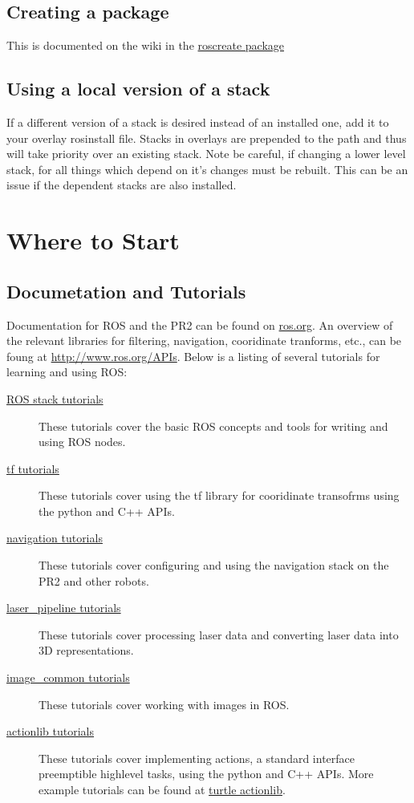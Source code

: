 \subsection{Creating a package}
This is documented on the wiki in the
\href{http://www.ros.org/wiki/roscreate}{roscreate package}

\subsection{Using a local version of a stack}
If a different version of a stack is desired instead of an installed
one, add it to your overlay rosinstall file.  Stacks in overlays are
prepended to the path and thus will take priority over an existing
stack.  Note be careful, if changing a lower level stack, for all
things which depend on it's changes must be rebuilt. This can be an
issue if the dependent stacks are also installed.

\section{Where to Start}
\subsection{Documetation and Tutorials}
Documentation for ROS and the PR2 can be found on \href{http://www.ros.org}{ros.org}. An overview 
of the relevant libraries for filtering, navigation, cooridinate tranforms, etc., can be foung at 
\href{http://www.ros.org/APIs}{http://www.ros.org/APIs}. Below is a listing of several tutorials 
for learning and using ROS:
\begin{description}
\item[\href{http://www.ros.org/wiki/ROS/Tutorials}{ROS stack tutorials}] These tutorials cover the
basic ROS concepts and tools for writing and using ROS nodes.
\item[\href{http://www.ros.org/wiki/tf/Tutorials}{tf tutorials}] These tutorials cover using the tf 
library for cooridinate transofrms using the python and C++ APIs.
\item[\href{http://www.ros.org/wiki/navigation/Tutorials}{navigation tutorials}] These tutorials 
cover configuring and using the navigation stack on the PR2 and other robots.
\item[\href{http://www.ros.org/wiki/laser_pipeline/Tutorials}{laser\_pipeline tutorials}] These tutorials 
cover processing laser data and converting laser data into 3D representations.
\item[\href{http://www.ros.org/wiki/image_common/Tutorials}{image\_common tutorials}] These tutorials 
cover working with images in ROS.
\item[\href{http://www.ros.org/wiki/actionlib_tutorials/Tutorials}{actionlib tutorials}] These 
tutorials cover implementing actions, a standard interface preemptible highlevel tasks, using 
the python and C++ APIs. More example tutorials can be found at 
\href{http://www.ros.org/wiki/turtle_actionlib}{turtle actionlib}.
\end{description}

